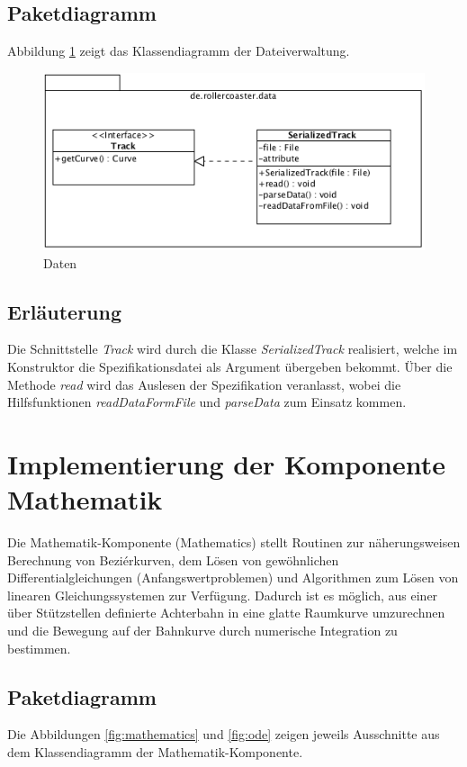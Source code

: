 \subsection{Paketdiagramm}

Abbildung \ref{fig:data} zeigt das Klassendiagramm der Dateiverwaltung.

\begin{figure}
\includegraphics[width=\linewidth]{bilder/Data}
\caption{Daten}
\label{fig:data}
\end{figure}

\subsection{Erläuterung}

Die Schnittstelle \emph{Track} wird durch die Klasse \emph{SerializedTrack} realisiert,
welche im Konstruktor die Spezifikationsdatei als Argument übergeben bekommt. Über
die Methode \emph{read} wird das Auslesen der Spezifikation veranlasst, wobei
die Hilfsfunktionen \emph{readDataFormFile} und \emph{parseData} zum Einsatz kommen.

\section{Implementierung der Komponente Mathematik}

Die Mathematik-Komponente (Mathematics) stellt Routinen zur näherungsweisen Berechnung
von Beziérkurven, dem Lösen von gewöhnlichen Differentialgleichungen 
(Anfangswertproblemen) und Algorithmen zum Lösen von linearen Gleichungssystemen
zur Verfügung. Dadurch ist es möglich, aus einer über Stützstellen definierte 
Achterbahn in eine glatte Raumkurve umzurechnen und die Bewegung auf
der Bahnkurve durch numerische Integration zu bestimmen.

\subsection{Paketdiagramm}
Die Abbildungen \ref{fig:mathematics} und \ref{fig:ode} zeigen jeweils Ausschnitte
aus dem Klassendiagramm der Mathematik-Komponente.

